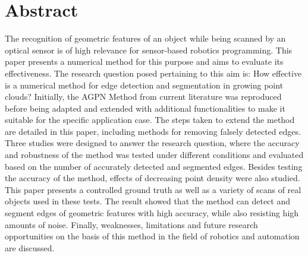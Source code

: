 \section*{\centering Abstract}
The recognition of geometric features of an object while being scanned by an optical sensor is of high relevance for sensor-based robotics programming. This paper presents a numerical method for this purpose and aims to evaluate its effectiveness. The research question posed pertaining to this aim is: How effective is a numerical method for edge detection and segmentation in growing point clouds? Initially, the AGPN Method from current literature was reproduced before being adapted and extended with additional functionalities to make it suitable for the specific application case. The steps taken to extend the method are detailed in this paper, including methods for removing falsely detected edges. Three studies were designed to answer the research question, where the accuracy and robustness of the method was tested under different conditions and evaluated based on the number of accurately detected and segmented edges. Besides testing the accuracy of the method, effects of decreasing point density were also studied. This paper presents a controlled ground truth as well as a variety of scans of real objects used in these tests. The result showed that the method can detect and segment edges of geometric features with high accuracy, while also resisting high amounts of noise. Finally, weaknesses, limitations and future research opportunities on the basis of this method in the field of robotics and automation are discussed.
